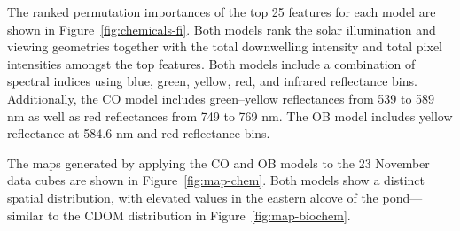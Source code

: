 \documentclass[remotesensing,article,accept,pdftex,moreauthors]{Definitions/mdpi}
\begin{document}
The ranked permutation importances of the top 25 features for each model are shown in Figure~\ref{fig:chemicals-fi}. Both models rank the solar illumination and viewing geometries together with the total downwelling intensity and total pixel intensities amongst the top features. Both models include a combination of spectral indices using blue, green, yellow, red, and infrared reflectance bins. Additionally, the CO model includes green--yellow reflectances from 539 to 589 nm as well as red reflectances from 749 to 769 nm. The OB model includes yellow reflectance at 584.6 nm and red reflectance bins.

The maps generated by applying the CO and OB models to the 23 November data cubes are shown in Figure~\ref{fig:map-chem}. Both models show a distinct spatial distribution, with elevated values in the eastern alcove of the pond---similar to the CDOM distribution in Figure~\ref{fig:map-biochem}.
\end{document}
